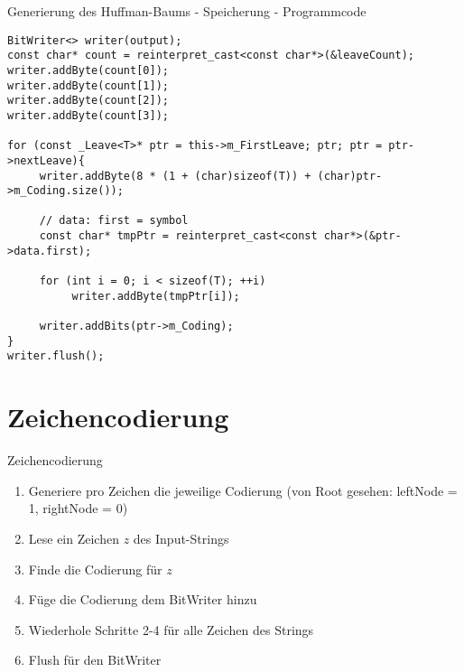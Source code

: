 \documentclass{beamer}
\begin{document}
  \begin{frame}[fragile]{Generierung des Huffman-Baums - \newline Speicherung - Programmcode}
  	\begin{lstlisting}[style=numbers]
BitWriter<> writer(output);
const char* count = reinterpret_cast<const char*>(&leaveCount);
writer.addByte(count[0]);
writer.addByte(count[1]);
writer.addByte(count[2]);
writer.addByte(count[3]);

for (const _Leave<T>* ptr = this->m_FirstLeave; ptr; ptr = ptr->nextLeave){
     writer.addByte(8 * (1 + (char)sizeof(T)) + (char)ptr->m_Coding.size());

     // data: first = symbol
     const char* tmpPtr = reinterpret_cast<const char*>(&ptr->data.first);
     
     for (int i = 0; i < sizeof(T); ++i)
          writer.addByte(tmpPtr[i]);

     writer.addBits(ptr->m_Coding);
}
writer.flush();
\end{lstlisting}
\end{frame}
    
  \section{Zeichencodierung}
  \begin{frame}{Zeichencodierung}
  	\begin{enumerate}
  		\item Generiere pro Zeichen die jeweilige Codierung \newline (von Root gesehen: leftNode = 1, rightNode = 0)
  		\item Lese ein Zeichen $z$ des Input-Strings
  		\item Finde die Codierung für $z$
  		\item Füge die Codierung dem BitWriter hinzu
  		\item Wiederhole Schritte 2-4 für alle Zeichen des Strings
  		\item Flush für den BitWriter
  	\end{enumerate}
  \end{frame}
  
\end{document}
